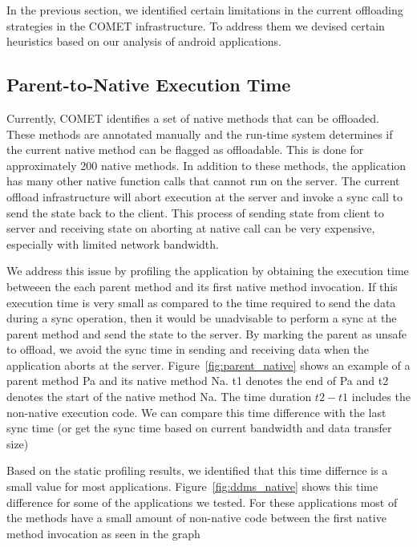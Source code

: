 In the previous section, we identified certain limitations in the current offloading strategies
in the COMET infrastructure. To address them we devised certain heuristics based on our analysis
of android applications.

\subsection{Parent-to-Native Execution Time}
Currently, COMET identifies a set of native methods that can be offloaded. These methods are annotated manually
and the run-time system determines if the current native method can be flagged as offloadable. This is done for
approximately 200 native methods. In addition to these methods, the application has many other native function calls
that cannot run on the server. The current offload infrastructure will abort execution at the server and invoke a sync
call to send the state back to the client. This process of sending state from client to server and receiving state on
aborting at native call can be very expensive, especially with limited network bandwidth.

We address this issue by profiling the application by obtaining the execution time betweeen the each parent method and its
first native method invocation. If this execution time is very small as compared to the time required to send the data during
a sync operation, then it would be unadvisable to perform a sync at the parent method and send the state to the server. By marking the parent as
unsafe to offload, we avoid the sync time in sending and receiving data when the application aborts at the server.
Figure~\ref{fig:parent_native} shows an example of a parent method Pa and its native method Na. t1 denotes the end of Pa and t2
denotes the start of the native method Na. The time duration $t2-t1$ includes the non-native execution code. We can compare this
time difference with the last sync time (or get the sync time based on current bandwidth and data transfer size)

Based on the static profiling results, we identified that this time differnce is a small value for most applications.
Figure~\ref{fig:ddms_native} shows this time difference for some of the applications we tested. For these applications
most of the methods have a small amount of non-native code between the first native method invocation as seen in the
graph

